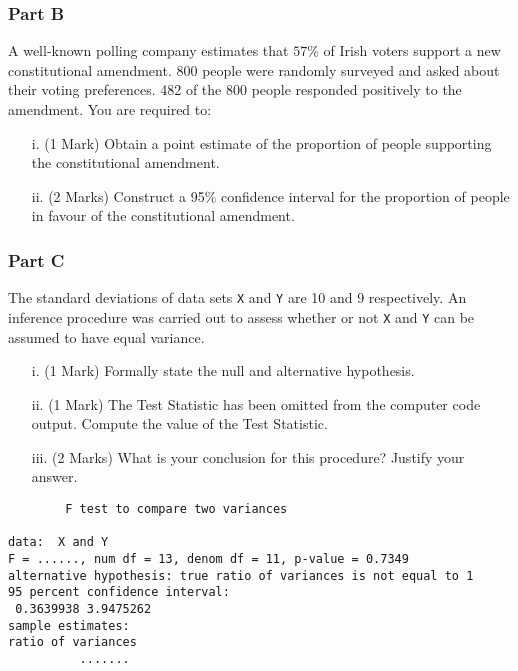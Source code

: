 \documentclass[a4paper,12pt]{article}
\begin{document}
\subsubsection*{Part B} %
A well-known polling company estimates that $57\%$ of Irish voters support a new constitutional amendment. 800 people were randomly surveyed and asked about their voting preferences. 482 of the 800 people responded positively to the amendment. You are required to:

\begin{itemize}
\item [i.](1 Mark) Obtain a point estimate of the proportion of people supporting the constitutional amendment.
\item [ii.](2 Marks) Construct a 95\% confidence interval for the proportion of people in favour of the constitutional amendment.
\end{itemize}

\subsubsection*{Part C} %
The standard deviations of data sets \texttt{X} and \texttt{Y} are 10 and 9 respectively. An inference procedure was carried out to assess whether or not \texttt{X} and \texttt{Y} can be assumed to have equal variance.
\begin{itemize}
\item[i.](1 Mark) Formally state the null and alternative hypothesis.
\item[ii.](1 Mark) The Test Statistic has been omitted from the computer code output. Compute the value of the Test Statistic.
\item[iii.](2 Marks) What is your conclusion for this procedure? Justify your answer.
\end{itemize}

\begin{framed}
\begin{verbatim}
        F test to compare two variances

data:  X and Y
F = ......, num df = 13, denom df = 11, p-value = 0.7349
alternative hypothesis: true ratio of variances is not equal to 1
95 percent confidence interval:
 0.3639938 3.9475262
sample estimates:
ratio of variances
          .......
\end{verbatim}
\end{framed}
\end{document}
